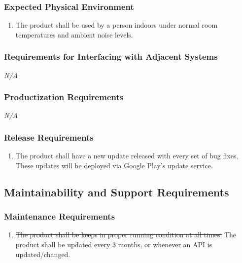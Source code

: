 \documentclass[]{article}
\newcounter{saveenum}
\newcommand{\pauseEnum}{\setcounter{saveenum}{\value{enumi}}}
\newcommand{\resumeEnum}{\setcounter{enumi}{\value{saveenum}}}
\newcommand{\NA}{\indent\indent\emph{N/A}}
\begin{document}
\subsubsection{Expected Physical Environment}
\label{ssub:expected_physical_environment}
\begin{enumerate}[{OE}1. ]
	\item The product shall be used by a person indoors under normal room temperatures and ambient noise levels.
	\pauseEnum
\end{enumerate}

\subsubsection{Requirements for Interfacing with Adjacent Systems}
\label{ssub:requirements_for_interfacing_with_adjacent_systems}
	\NA

\subsubsection{Productization Requirements}
\label{ssub:productization_requirements}
	\NA

\subsubsection{Release Requirements}
\label{ssub:release_requirements}
\begin{enumerate}[{OE}1. ]
	\resumeEnum
	\item The product shall have a new update released with every set of bug fixes. These updates will be deployed via Google Play's update service. 
	\pauseEnum
\end{enumerate}


\subsection{Maintainability and Support Requirements}
\label{sub:maintainability_and_support_requirements}

\subsubsection{Maintenance Requirements}
\label{ssub:maintenance_requirements}
\begin{enumerate}[{MS}1. ]
	\item \sout{The product shall be keeps in proper running condition at all times.}
	The product shall be updated every 3 months, or whenever an API is updated/changed.
	\pauseEnum
\end{enumerate}
\end{document}
